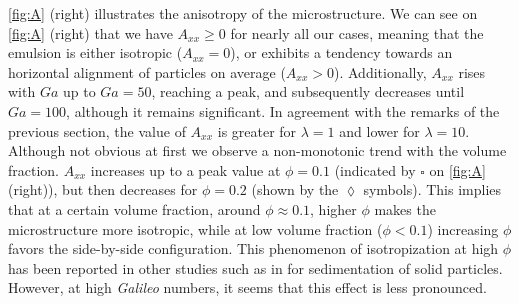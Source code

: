  
\ref{fig:A} (right) illustrates the anisotropy of the microstructure. We can see on \ref{fig:A} (right) that we have $A_{xx} \ge 0$ for nearly all our cases, meaning that the emulsion is either isotropic ($A_{xx} = 0$), or exhibits a tendency towards an horizontal alignment of particles on average ($A_{xx} >0$). %
Additionally, $A_{xx}$ rises with $Ga$ up to $Ga = 50$, reaching a peak, and subsequently decreases until $Ga = 100$, although it remains significant.
In agreement with the remarks of the previous section, the value of $A_{xx}$ is greater for $\lambda = 1$ and lower for  $\lambda = 10$.
Although not obvious at first we observe a non-monotonic trend with the volume fraction. $A_{xx}$ increases up to a peak value at $\phi = 0.1$ (indicated by \textcolor{col3}{$\pmb\square$} on \ref{fig:A} (right)), but then decreases for $\phi=0.2$ (shown by the \textcolor{col4}{$\pmb\lozenge$} symbols). %
This implies that at a certain volume fraction, around $\phi \approx 0.1$, higher $\phi$ makes the microstructure more isotropic, while at low volume fraction ($\phi < 0.1$) increasing $\phi$ favors the side-by-side configuration.
This phenomenon of isotropization at high $\phi$ has been reported in other studies such as in \citet{seyed2021sedimentation} for sedimentation of solid particles. 
However, at high \textit{Galileo} numbers, it seems that this effect is less pronounced. 


